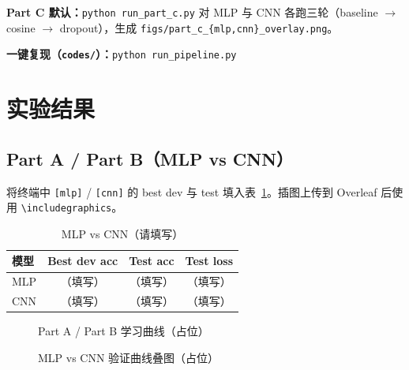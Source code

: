 \documentclass[UTF8,a4paper]{ctexart}
\begin{document}
\noindent\textbf{Part C 默认：}\texttt{python run\_part\_c.py} 对 MLP 与 CNN 各跑三轮（baseline $\to$ cosine $\to$ dropout），生成 \texttt{figs/part\_c\_\{mlp,cnn\}\_overlay.png}。

\noindent\textbf{一键复现（\texttt{codes/}）：}\texttt{python run\_pipeline.py}

\section{实验结果}

\subsection{Part A / Part B（MLP vs CNN）}
将终端中 \texttt{[mlp]} / \texttt{[cnn]} 的 best dev 与 test 填入表~\ref{tab:ab}。插图上传到 Overleaf 后使用 \texttt{\textbackslash includegraphics}。

\begin{table}[htbp]
  \centering
  \caption{MLP vs CNN（请填写）}
  \label{tab:ab}
  \begin{tabular}{lccc}
    \toprule
    模型 & Best dev acc & Test acc & Test loss \\
    \midrule
    MLP & （填写） & （填写） & （填写） \\
    CNN & （填写） & （填写） & （填写） \\
    \bottomrule
  \end{tabular}
\end{table}

\begin{figure}[htbp]
  \centering
  \caption{Part A / Part B 学习曲线（占位）}
\end{figure}

\begin{figure}[htbp]
  \centering
  \caption{MLP vs CNN 验证曲线叠图（占位）}
\end{figure}
\end{document}
